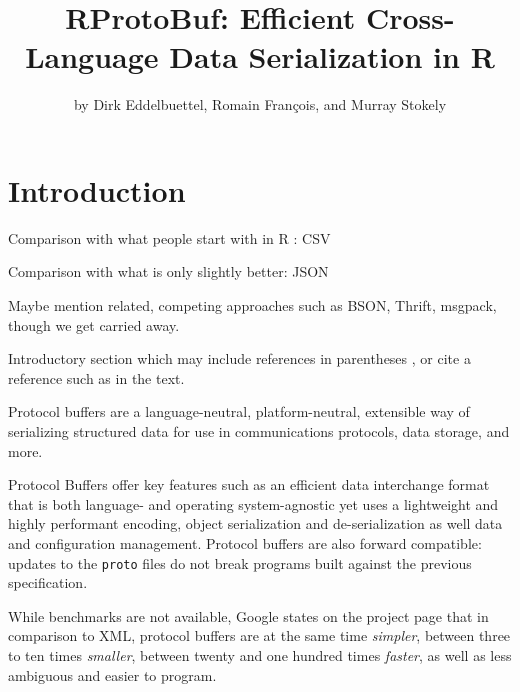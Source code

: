 \title{RProtoBuf: Efficient Cross-Language Data Serialization in R}
\author{by Dirk Eddelbuettel, Romain Fran\c{c}ois, and Murray Stokely}

\maketitle



\section{Introduction}

Comparison with what people start with in R : CSV

Comparison with what is only slightly better: JSON

Maybe mention related, competing approaches such as BSON, Thrift, msgpack,
though we get carried away.

Introductory section which may include references in parentheses
\citep{R}, or cite a reference such as \citet{R} in the text.

Protocol buffers are a language-neutral, platform-neutral, extensible
way of serializing structured data for use in communications
protocols, data storage, and more.

Protocol Buffers offer key features such as an efficient data interchange
format that is both language- and operating system-agnostic yet uses a
lightweight and highly performant encoding, object serialization and
de-serialization as well data and configuration management. Protocol
buffers are also forward compatible: updates to the \texttt{proto}
files do not break programs built against the previous specification.

While benchmarks are not available, Google states on the project page that in
comparison to XML, protocol buffers are at the same time \textsl{simpler},
between three to ten times \textsl{smaller}, between twenty and one hundred
times \textsl{faster}, as well as less ambiguous and easier to program.

